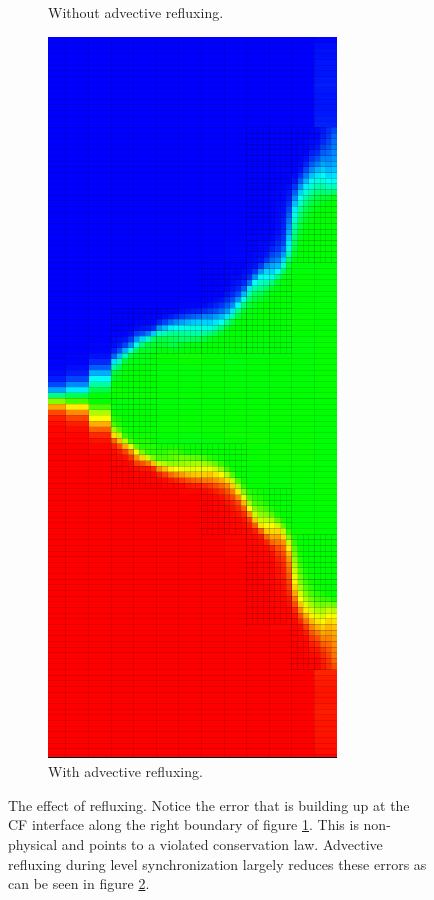\documentclass[12pt]{article}
\begin{document}
\begin{figure}
\begin{subfigure}{.5\textwidth}
  \caption{Without advective refluxing.}
  \label{fig:subWithoutRefluxing}
\end{subfigure}%
\begin{subfigure}{.5\textwidth}
  \centering
  \includegraphics[width=.75\linewidth]{AdvectiveRefluxFixCropped.png}
  \caption{With advective refluxing.}
  \label{fig:subWithRefluxing}
\end{subfigure}
\caption{The effect of refluxing. Notice the error that is building up at the CF interface along the right boundary of figure \ref{fig:subWithoutRefluxing}. This is non-physical and points to a violated conservation law. Advective refluxing during level synchronization largely reduces these errors as can be seen in figure \ref{fig:subWithRefluxing}. }
\label{fig:AdvectiveRefluxingEffect}
\end{figure}
\end{document}
